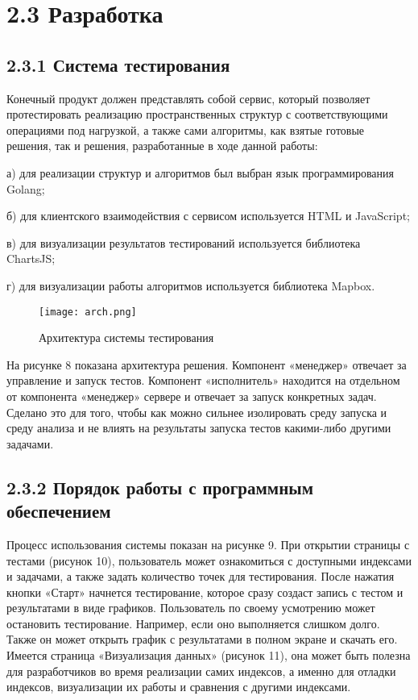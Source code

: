 \section{2.3 Разработка}
\label{cha:development}

\subsection{2.3.1 Система тестирования}

Конечный продукт должен представлять собой сервис, который позволяет протестировать реализацию пространственных структур с соответствующими операциями под нагрузкой, а также сами алгоритмы, как взятые готовые решения, так и решения, разработанные в ходе данной работы:
\par а) для реализации структур и алгоритмов был выбран язык программирования Golang;
\par б) для клиентского взаимодействия с сервисом используется HTML и JavaScript;
\par в) для визуализации результатов тестирований используется библиотека ChartsJS;
\par г) для визуализации работы алгоритмов используется библиотека Mapbox.
  
\par\vspace{1em}
\begin{figure}[H]
    \centering
    \texttt{[image: arch.png]}
    \caption{Архитектура системы тестирования}
\end{figure}

На рисунке 8 показана архитектура решения. Компонент «менеджер» отвечает за управление и запуск тестов. Компонент «исполнитель» находится на отдельном от компонента «менеджер» сервере и отвечает за запуск конкретных задач. Сделано это для того, чтобы как можно сильнее изолировать среду запуска и среду анализа и не влиять на результаты запуска тестов какими-либо другими задачами. 


\subsection{2.3.2 Порядок работы с программным обеспечением}
Процесс использования системы показан на рисунке 9. При открытии страницы с тестами (рисунок 10), пользователь может ознакомиться с доступными индексами и задачами, а также задать количество точек для тестирования. После нажатия кнопки «Старт» начнется тестирование, которое сразу создаст запись с тестом и результатами в виде графиков. 
Пользователь по своему усмотрению может остановить тестирование. Например, если оно выполняется слишком долго. Также он может открыть график с результатами в полном экране и скачать его. 
Имеется страница «Визуализация данных» (рисунок 11), она может быть полезна для разработчиков во время реализации самих индексов, а именно для отладки индексов, визуализации их работы и сравнения с другими индексами. 

